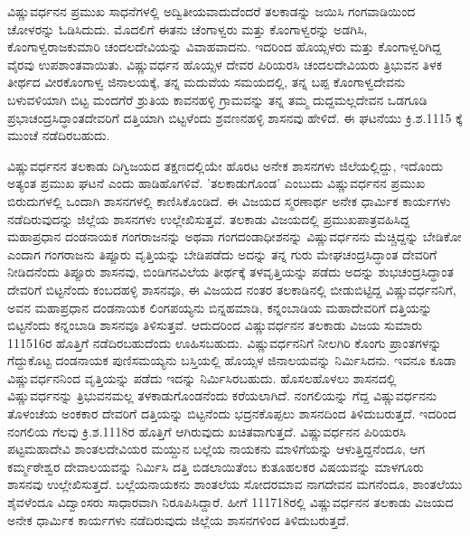 ವಿಷ್ಣುವರ್ಧನನ ಪ್ರಮುಖ ಸಾಧನೆಗಳಲ್ಲಿ ಅದ್ವಿತೀಯವಾದುದೆಂದರೆ ತಲಕಾಡನ್ನು ಜಯಿಸಿ ಗಂಗವಾಡಿಯಿಂದ ಚೋಳರನ್ನು ಓಡಿಸಿದುದು. ಮೊದಲಿಗೆ ಈತನು ಚೆಂಗಾಳ್ವರು ಮತ್ತು ಕೊಂಗಾಳ್ವರನ್ನು ಅಡಗಿಸಿ, ಕೊಂಗಾಳ್ವರಾಜಕುಮಾರಿ ಚಂದಲದೇವಿಯನ್ನು ವಿವಾಹವಾದನು. ಇದರಿಂದ ಹೊಯ್ಸಳರು ಮತ್ತು ಕೊಂಗಾಳ್ವರಿಗಿದ್ದ ವೈರವು ಉಪಶಾಂತವಾಯಿತು. ವಿಷ್ಣುವರ್ಧನ ಹೊಯ್ಸಳ ದೇವರ ಪಿರಿಯರಸಿ ಚಂದಲದೇವಿಯರು ತ್ರಿಭುವನ ತಿಳಕ ತೀರ್ಥದ ವೀರಕೊಂಗಾಳ್ವ ಜಿನಾಲಯಕ್ಕೆ, ತನ್ನ ಮದುವೆಯ ಸಮಯದಲ್ಲಿ, ತನ್ನ ಬಪ್ಪ ಕೊಂಗಾಳ್ವದೇವನು ಬಳುವಳಿಯಾಗಿ ಬಿಟ್ಟ ಮಂದಗೆರೆ ಶ್ರುತಿಯ ಕಾವನಹಳ್ಳಿ ಗ್ರಾಮವನ್ನು ತನ್ನ ತಮ್ಮ ದುದ್ದಮಲ್ಲದೇವನ ಒಡಗೂಡಿ ಪ್ರಭಾಚಂದ್ರಸಿದ್ಧಾಂತದೇವರಿಗೆ ದತ್ತಿಯಾಗಿ ಬಿಟ್ಟಳೆಂದು ಶ್ರವಣನಹಳ್ಳಿ ಶಾಸನವು ಹೇಳಿದೆ. ಈ ಘಟನೆಯು ಕ್ರಿ.ಶ.1115 ಕ್ಕೆ ಮುಂಚೆ ನಡೆದಿರಬಹುದು. 

ವಿಷ್ಣುವರ್ಧನನ ತಲಕಾಡು ದಿಗ್ವಿಜಯದ ತಕ್ಷಣದಲ್ಲಿಯೇ ಹೊರಟ ಅನೇಕ ಶಾಸನಗಳು ಜಿಲೆಯಲ್ಲಿದ್ದು, ಇದೊಂದು ಅತ್ಯಂತ ಪ್ರಮುಖ ಘಟನೆ ಎಂದು ಹಾಡಿಹೊಗಳಿವೆ. 'ತಲಕಾಡುಗೊಂಡ' ಎಂಬುದು ವಿಷ್ಣುವರ್ಧನನ ಪ್ರಮುಖ ಬಿರುದುಗಳಲ್ಲಿ ಒಂದಾಗಿ ಶಾಸನಗಳಲ್ಲಿ ಕಾಣಿಸಿಕೊಂಡಿದೆ. ಈ ವಿಜಯದ ಸ್ಮರಣಾರ್ಥ ಅನೇಕ ಧಾರ್ಮಿಕ ಕಾರ್ಯಗಳು ನಡೆದಿರುವುದನ್ನು ಜಿಲ್ಲೆಯ ಶಾಸನಗಳು ಉಲ್ಲೇಖಿಸುತ್ತವೆ. ತಲಕಾಡು ವಿಜಯದಲ್ಲಿ ಪ್ರಮುಖಪಾತ್ರವಹಿಸಿದ್ದ ಮಹಾಪ್ರಧಾನ ದಂಡನಾಯಕ ಗಂಗರಾಜನನ್ನು ಅಥವಾ ಗಂಗದಂಡಾಧೀಶನನ್ನು ವಿಷ್ಣುವರ್ಧನನು ಮೆಚ್ಚಿದ್ದನ್ನು ಬೇಡಿಕೋ ಎಂದಾಗ ಗಂಗರಾಜನು ತಿಪ್ಪೂರು ವೃತ್ತಿಯನ್ನು ಬೇಡಿಪಡೆದು ಅದನ್ನು ತನ್ನ ಗುರು ಮೇಘಚಂದ್ರಸಿದ್ಧಾಂತ ದೇವರಿಗೆ ನೀಡಿದನೆಂದು ತಿಪ್ಪೂರು ಶಾಸನವು, ಬಿಂಡಿಗನವಿಲೆಯ ತೀರ್ಥಕ್ಕೆ ತಳವೃತ್ತಿಯನ್ನು ಪಡೆದು ಅದನ್ನು ಶುಭಚಂದ್ರಸಿದ್ಧಾಂತ ದೇವರಿಗೆ ಬಿಟ್ಟನೆಂದು ಕಂಬದಹಳ್ಳಿ ಶಾಸನವೂ, ಈ ವಿಜಯದ ನಂತರ ತಲಕಾಡಿನಲ್ಲಿ ಬೀಡುಬಿಟ್ಟಿದ್ದ ವಿಷ್ಣುವರ್ಧನನಿಗೆ, ಅವನ ಮಹಾಪ್ರಧಾನ ದಂಡನಾಯಕ ಲಿಂಗಪಯ್ಯನು ಬಿನ್ನಹಮಾಡಿ, ಕನ್ನಂಬಾಡಿಯ ಮಹಾದೇವರಿಗೆ ದತ್ತಿಯನ್ನು ಬಿಟ್ಟನೆಂದು ಕನ್ನಂಬಾಡಿ ಶಾಸನವೂ ತಿಳಿಸುತ್ತವೆ. ಆದುದರಿಂದ ವಿಷ್ಣುವರ್ಧನನ ತಲಕಾಡು ವಿಜಯ ಸುಮಾರು 111516ರ ಹೊತ್ತಿಗೆ ನಡೆದಿರಬಹುದೆಂದು ಊಹಿಸಬಹುದು. ವಿಷ್ಣುವರ್ಧನನಿಗೆ ನೀಲಗಿರಿ ಕೊಂಗು ಪ್ರಾಂತಗಳನ್ನು ಗೆದ್ದುಕೊಟ್ಟ ದಂಡನಾಯಕ ಪುಣಿಸಮಯ್ಯನು ಬಸ್ತಿಯಲ್ಲಿ ಹೊಯ್ಸಳ ಜಿನಾಲಯವನ್ನು ನಿರ್ಮಿಸಿದನು. ಇವನೂ ಕೂಡಾ ವಿಷ್ಣುವರ್ಧನನಿಂದ ವೃತ್ತಿಯನ್ನು ಪಡೆದು ಇದನ್ನು ನಿರ್ಮಿಸಿರಬಹುದು. ಹೊಸಲಹೊಳಲು ಶಾಸನದಲ್ಲಿ ವಿಷ್ಣುವರ್ಧನನ್ನು ತ್ರಿಭುವನಮಲ್ಲ ತಳಕಾಡುಗೊಂಡನೆಂದು ಕರೆಯಲಾಗಿದೆ. ನಂಗಲಿಯನ್ನು ಗೆದ್ದ ವಿಷ್ಣುವರ್ಧನನು ತೊಳಂಚೆಯ ಅಂಕಕಾರ ದೇವರಿಗೆ ದತ್ತಿಯನ್ನು ಬಿಟ್ಟನೆಂದು ಭದ್ರನಕೊಪ್ಪಲು ಶಾಸನದಿಂದ ತಿಳಿದು\-ಬರುತ್ತದೆ. ಇದರಿಂದ ನಂಗಲಿಯ ಗೆಲವು ಕ್ರಿ.ಶ.1118ರ ಹೊತ್ತಿಗೆ ಆಗಿರುವುದು ಖಚಿತವಾಗುತ್ತದೆ. ವಿಷ್ಣುವರ್ಧನನ ಪಿರಿಯರಸಿ ಪಟ್ಟಮಹಾದೇವಿ ಶಾಂತಲದೇವಿಯರ ಮಯ್ದುನ ಬಲ್ಲೆಯ ನಾಯಕನು ಮಾಳಿಗೆಯನ್ನು ಆಳುತ್ತಿದ್ದನೆಂದೂ, ಆಗ ಕರ್ಮ್ಮಠೇಶ್ವರ ದೇವಾಲಯವನ್ನು ನಿರ್ಮಿಸಿ ದತ್ತಿ ಬಿಡಲಾಯಿತೆಂಬ ಕುತೂಹಲಕರ ವಿಷಯವನ್ನು ಮಾಳಗೂರು ಶಾಸನವು ಉಲ್ಲೇಖಿಸುತ್ತದೆ. ಬಲ್ಲೆಯನಾಯಕನು ಶಾಂತಲೆಯ ಸೋದರಮಾವ ನಾಗದೇವನ ಮಗನೆಂದೂ, ಶಾಂತಲೆಯು ಶೈವಳೆಂದೂ ವಿದ್ವಾಂಸರು ಸಾಧಾರವಾಗಿ ನಿರೂಪಿಸಿದ್ದಾರೆ. ಹೀಗೆ 111718ರಲ್ಲಿ ವಿಷ್ಣುವರ್ಧನನ ತಲಕಾಡು ವಿಜಯದ ಅನೇಕ ಧಾರ್ಮಿಕ ಕಾರ್ಯಗಳು ನಡೆದಿರುವುದು ಜಿಲ್ಲೆಯ ಶಾಸನಗಳಿಂದ ತಿಳಿದುಬರುತ್ತದೆ.

